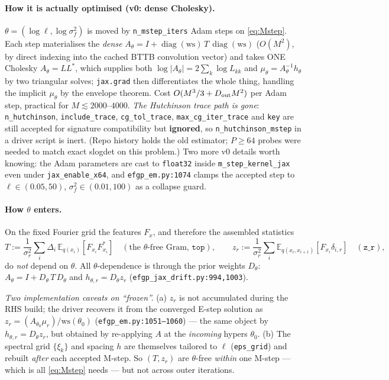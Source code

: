 \documentclass[11pt]{article}
\newcommand{\Eqx}{\mathbb{E}_{q(x_i)}}
\newcommand{\Eqxx}{\mathbb{E}_{q(x_i,x_{i+1})}}
\newcommand{\diag}{\operatorname{diag}}
\newcommand{\code}[1]{\texttt{#1}}
\newcommand{\Dt}{D_{\rm out}}
\begin{document}
\paragraph{How it is actually optimised (v0: dense Cholesky).}
$\theta=(\log\ell,\log\sigma_f^2)$ is moved by \code{n\_mstep\_iters}
Adam steps on \eqref{eq:Mstep}. Each step materialises the \emph{dense}
$A_\theta = I + \diag(\text{ws})\,T\,\diag(\text{ws})$ ($O(M^2)$, by
direct indexing into the cached BTTB convolution vector) and takes ONE
Cholesky $A_\theta=LL^*$, which supplies both
$\log|A_\theta|=2\sum_k\log L_{kk}$ and $\mu_\theta=A_\theta^{-1}h_\theta$
by two triangular solves; \code{jax.grad} then differentiates the whole
thing, handling the implicit $\mu_\theta$ by the envelope theorem. Cost
$O(M^3/3 + \Dt M^2)$ per Adam step, practical for $M\lesssim 2000$--$4000$.
\emph{The Hutchinson trace path is gone}: \code{n\_hutchinson},
\code{include\_trace}, \code{cg\_tol\_trace}, \code{max\_cg\_iter\_trace}
and \code{key} are still accepted for signature compatibility but
\textbf{ignored}, so \code{n\_hutchinson\_mstep} in a driver script is
inert. (Repo history holds the old estimator; $P\!\ge\!64$ probes were
needed to match exact slogdet on this problem.) Two more v0 details worth
knowing: the Adam parameters are cast to \code{float32} inside
\code{m\_step\_kernel\_jax} even under \code{jax\_enable\_x64}, and
\code{efgp\_em.py:1074} clamps the accepted step to
$\ell\in(0.05,50)$, $\sigma_f^2\in(0.01,100)$ as a collapse guard.

\paragraph{How $\theta$ enters.} On the fixed Fourier grid the features $F_x$, and
therefore the assembled statistics
\begin{equation}
T:=\frac{1}{\sigma_r^2}\sum_i\Delta_i\,\Eqx[F_{x_i}F_{x_i}^*]
\quad(\text{the }\theta\text{-free Gram, }\code{top}),
\qquad
z_r:=\frac{1}{\sigma_r^2}\sum_i\Eqxx[F_{x_i}\delta_{i,r}]
\quad(\code{z\_r}),
\label{eq:frozen}
\end{equation}
do \emph{not} depend on $\theta$. All $\theta$-dependence is through the prior
weights $D_\theta$: $A_\theta=I+D_\theta\,T\,D_\theta$ and $h_{\theta,r}=D_\theta z_r$
(\texttt{efgp\_jax\_drift.py:994,1003}).

\emph{Two implementation caveats on ``frozen''.} (a) $z_r$ is not
accumulated during the RHS build; the driver recovers it from the
converged E-step solution as
$z_r = (A_{\theta_0}\mu_r)/\text{ws}(\theta_0)$
(\texttt{efgp\_em.py:1051--1060}) --- the same object by
$h_{\theta,r}=D_\theta z_r$, but obtained by re-applying $A$ at the
\emph{incoming} hypers $\theta_0$. (b) The spectral grid
$\{\xi_k\}$ and spacing $h$ are themselves tailored to $\ell$
(\code{eps\_grid}) and rebuilt \emph{after} each accepted M-step. So
$(T,z_r)$ are $\theta$-free \emph{within} one M-step --- which is all
\eqref{eq:Mstep} needs --- but not across outer iterations.
\end{document}
